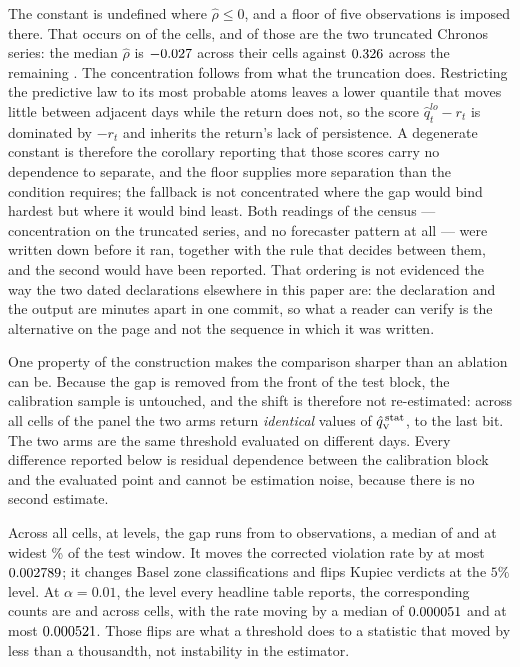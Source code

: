 The constant is undefined where $\hat\rho \le 0$, and a floor of five
observations is imposed there. That occurs on \nRhoFallback{} of the
\nRhoCells{} cells, and \nRhoFallbackTrunc{} of those are the two truncated
Chronos series: the median $\hat\rho$ is $-0.027$ across their
\nRhoTruncCells{} cells against $0.326$ across the remaining
\nRhoOtherCells. The concentration follows from what the truncation does.
Restricting the predictive law to its most probable atoms leaves a lower
quantile that moves little between adjacent days while the return does not, so
the score $\hat q^{lo}_t - r_t$ is dominated by $-r_t$ and inherits the return's
lack of persistence. A degenerate constant is therefore the corollary reporting
that those scores carry no dependence to separate, and the floor supplies more
separation than the condition requires; the fallback is not concentrated where
the gap would bind hardest but where it would bind least. Both readings of
the census --- concentration on the truncated series, and no forecaster pattern
at all --- were written down before it ran, together with the rule that decides
between them, and the second would have been reported. That ordering is not
evidenced the way the two dated declarations elsewhere in this paper are: the
declaration and the output are minutes apart in one commit, so what a reader can
verify is the alternative on the page and not the sequence in which it was
written.

One property of the construction makes the comparison sharper than an ablation
can be. Because the gap is removed from the front of the test block, the
calibration sample is untouched, and the shift is therefore not re-estimated:
across all \nGapAllCells{} cells of the panel the two arms return
\emph{identical} values of $\hat{q}_{\scriptscriptstyle\mathrm{V}}^{\,\mathrm{stat}}$, to the last bit. The two arms are the same
threshold evaluated on different days. Every difference reported below is
residual dependence between the calibration block and the evaluated point and
cannot be estimation noise, because there is no second estimate.

Across all \nGapAllCells{} cells, at \nGapAllLevels{} levels, the gap runs from
\nGapAllGapLo{} to \nGapAllGapHi{} observations, a median of
\nGapAllGapMed{} and at widest \nGapWidestPct\% of the test window. It moves
the corrected violation rate by at most $0.002789$; it changes
\nGapAllZoneChanges{} Basel zone classifications and flips
\nGapAllKupFlips{} Kupiec verdicts at the $5\%$ level. At $\alpha = 0.01$, the
level every headline table reports, the corresponding counts are
\nGapPanelZoneChanges{} and \nGapPanelKupFlips{} across \nGapPanelCells{}
cells, with the rate moving by a median of $0.000051$ and at most
$0.000521$. Those flips are what a threshold does to a statistic that
moved by less than a thousandth, not instability in the estimator.

